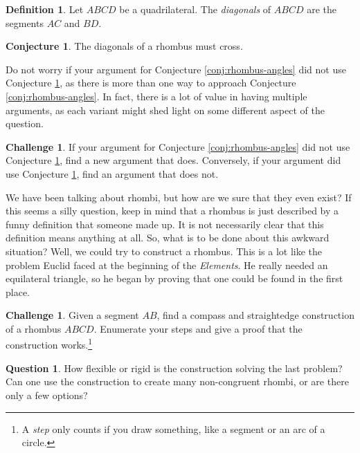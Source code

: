 \documentclass{tufte-handout}
\theoremstyle{definition}
\newtheorem{conjecture}[problem]{Conjecture}
\newtheorem*{definition}{Definition}
\newtheorem{question}[problem]{Question}
\newtheorem{challenge}[problem]{Challenge}
\begin{document}
\begin{definition}\label{defn:diagonals}
Let $ABCD$ be a quadrilateral. The \emph{diagonals} of $ABCD$ are the segments $AC$ and $BD$.
\end{definition}

\begin{conjecture}\label{conj:rhombus-diagonals}
The diagonals of a rhombus must cross.
\end{conjecture}



Do not worry if your argument for Conjecture \ref{conj:rhombus-angles} did not use Conjecture \ref{conj:rhombus-diagonals}, as there is more than one way to approach Conjecture \ref{conj:rhombus-angles}.
In fact, there is a lot of value in having multiple arguments, as each variant might shed light on some different aspect of the question.

\begin{challenge}\label{conj:rhombus-angles-redo}
If your argument for Conjecture \ref{conj:rhombus-angles} did not use Conjecture \ref{conj:rhombus-diagonals}, find a new argument that does.
Conversely, if your argument did use Conjecture \ref{conj:rhombus-diagonals}, find an argument that does not.
\end{challenge}


We have been talking about rhombi, but how are we sure that they even exist?
If this seems a silly question, keep in mind that a rhombus is just described by a funny definition that someone made up.
It is not necessarily clear that this definition means anything at all.
So, what is to be done about this awkward situation?
Well, we could try to construct a rhombus.
This is a lot like the problem Euclid faced at the beginning of the \emph{Elements}.
He really needed an equilateral triangle, so he began by proving that one could be found in the first place.

\begin{challenge}\label{prob:rhombus-construct}
Given a segment $AB$, find a compass and straightedge construction of a rhombus $ABCD$.
Enumerate your steps and give a proof that the construction works.\footnote{A \emph{step} only counts if you draw something, like a segment or an arc of a circle.}
\end{challenge}

\begin{question}\label{prob:rhombus-flexible}
How flexible or rigid is the construction solving the last problem?
Can one use the construction to create many non-congruent rhombi, or are there only a few options?
\end{question}
\end{document}

